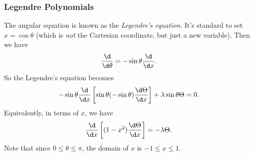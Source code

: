\documentclass[a4paper]{article}
\begin{document}
\subsubsection{Legendre Polynomials}
The angular equation is known as the \emph{Legendre's equation}. It's standard to set $x = \cos \theta$ (which is \emph{not} the Cartesian coordinate, but just a new variable). Then we have
\[
  \frac{\d}{\d \theta} = -\sin \theta \frac{\d}{\d x}.
\]
So the Legendre's equation becomes
\[
  -\sin \theta \frac{\d}{\d x}\left[\sin \theta (-\sin \theta) \frac{\d \Theta}{\d x}\right]+ \lambda \sin \theta \Theta = 0.
\]
Equivalently, in terms of $x$, we have
\[
  \frac{\d}{\d x}\left[(1 - x^2) \frac{\d \Theta}{\d x}\right] = -\lambda \Theta.
\]
Note that since $0 \leq \theta \leq \pi$, the domain of $x$ is $-1 \leq x \leq 1$.
\end{document}
